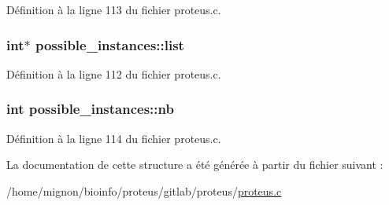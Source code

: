 Définition à la ligne 113 du fichier proteus.\+c.

\hypertarget{structpossible__instances_ae01205265cde71f6236cd587a9f22a35}{
\subsubsection[{list}]{\setlength{\rightskip}{0pt plus 5cm}int$\ast$ possible\+\_\+instances\+::list}}\label{structpossible__instances_ae01205265cde71f6236cd587a9f22a35}


Définition à la ligne 112 du fichier proteus.\+c.

\hypertarget{structpossible__instances_a881777469e3a7f6b8fe2a60d1c9e77cf}{
\subsubsection[{nb}]{\setlength{\rightskip}{0pt plus 5cm}int possible\+\_\+instances\+::nb}}\label{structpossible__instances_a881777469e3a7f6b8fe2a60d1c9e77cf}


Définition à la ligne 114 du fichier proteus.\+c.



La documentation de cette structure a été générée à partir du fichier suivant \+:\begin{DoxyCompactItemize}
\item 
/home/mignon/bioinfo/proteus/gitlab/proteus/\hyperlink{proteus_8c}{proteus.\+c}\end{DoxyCompactItemize}
